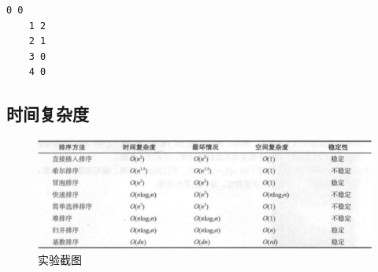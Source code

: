 \documentclass[a4paper,11pt,UTF8]{ctexart}
\begin{document}
\begin{lstlisting}[caption=5CSP.cpp,captionpos=b]
    0 0
    1 2
    2 1
    3 0
    4 0
\end{lstlisting}

\subsection{时间复杂度}
\begin{figure}[htbp] %
    \centering
    \includegraphics[width=12cm]{1.jpg}
    \caption{实验截图}
\end{figure}

\setlength{\parskip}{6pt}  %
\vspace{4cm}
\end{document}
